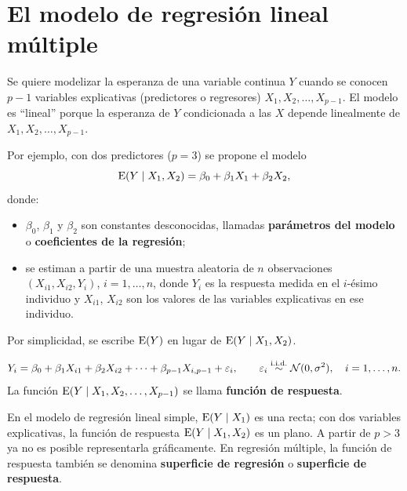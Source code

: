 \section{El modelo de regresión lineal múltiple}
\label{sec:t6-modelo}

Se quiere modelizar la esperanza de una variable continua $Y$ cuando se conocen $p-1$
variables explicativas (predictores o regresores) $X_1,X_2,\ldots,X_{p-1}$. El modelo es
``lineal'' porque la esperanza de $Y$ condicionada a las $X$ depende linealmente de
$X_1,X_2,\ldots,X_{p-1}$.

Por ejemplo, con dos predictores ($p=3$) se propone el modelo
\[
  \operatorname{E}(Y\mid X_1,X_2) = \beta_0+\beta_1X_1+\beta_2X_2 ,
\]
donde:
\begin{itemize}
  \item $\beta_0$, $\beta_1$ y $\beta_2$ son constantes desconocidas, llamadas
    \textbf{parámetros del modelo} o \textbf{coeficientes de la regresión};
  \item se estiman a partir de una muestra aleatoria de $n$ observaciones $(X_{i1},X_{i2},Y_i)$,
    $i=1,\ldots,n$, donde $Y_i$ es la respuesta medida en el $i$-ésimo individuo y $X_{i1}$,
    $X_{i2}$ son los valores de las variables explicativas en ese individuo.
\end{itemize}
Por simplicidad, se escribe $\operatorname{E}(Y)$ en lugar de $\operatorname{E}(Y\mid X_1,X_2)$.

\begin{definicion}
  \[
    Y_i = \beta_0+\beta_1X_{i1}+\beta_2X_{i2}+\cdots+\beta_{p-1}X_{i,p-1}+\varepsilon_i,
    \qquad \varepsilon_i\overset{\text{i.i.d.}}{\sim}\mathcal{N}(0,\sigma^2), \quad i=1,\ldots,n .
  \]
  La función $\operatorname{E}(Y\mid X_1,X_2,\ldots,X_{p-1})$ se llama \textbf{función de respuesta}.
\end{definicion}

En el modelo de regresión lineal simple, $\operatorname{E}(Y\mid X_1)$ es una recta; con dos variables
explicativas, la función de respuesta $\operatorname{E}(Y\mid X_1,X_2)$ es un plano. A partir de $p>3$ ya no es
posible representarla gráficamente. En regresión múltiple, la función de respuesta también se
denomina \textbf{superficie de regresión} o \textbf{superficie de respuesta}.

